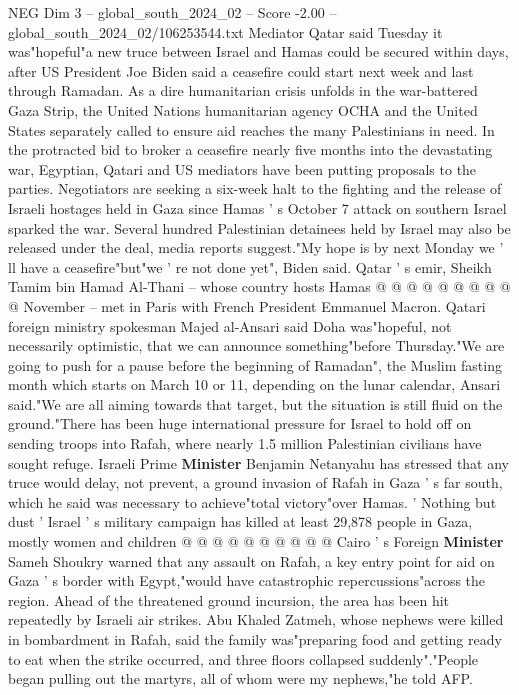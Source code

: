 \begin{textsample}{NEG Dim 3 – global\_south\_2024\_02 – Score -2.00 – global\_south\_2024\_02/106253544.txt}  \label{ex:f3_neg_082}
Mediator Qatar said Tuesday it was"hopeful"a new truce between Israel and Hamas could be secured within days, after US President Joe Biden said a ceasefire could start next week and last through Ramadan.
As a dire humanitarian crisis unfolds in the war-battered Gaza Strip, the United Nations humanitarian agency OCHA and the United States separately called to ensure aid reaches the many Palestinians in need.
In the protracted bid to broker a ceasefire nearly five months into the devastating war, Egyptian, Qatari and US mediators have been putting proposals to the parties.
Negotiators are seeking a six-week halt to the fighting and the release of Israeli hostages held in Gaza since Hamas ' s October 7 attack on southern Israel sparked the war.
Several hundred Palestinian detainees held by Israel may also be released under the deal, media reports suggest."My hope is by next Monday we ' ll have a ceasefire"but"we ' re not done yet", Biden said.
Qatar ' s emir, Sheikh Tamim bin Hamad Al-Thani -- whose country hosts Hamas @ @ @ @ @ @ @ @ @ @ November -- met in Paris with French President Emmanuel Macron.
Qatari foreign ministry spokesman Majed al-Ansari said Doha was"hopeful, not necessarily optimistic, that we can announce something"before Thursday."We are going to push for a pause before the beginning of Ramadan", the Muslim fasting month which starts on March 10 or 11, depending on the lunar calendar, Ansari said."We are all aiming towards that target, but the situation is still fluid on the ground."There has been huge international pressure for Israel to hold off on sending troops into Rafah, where nearly 1.5 million Palestinian civilians have sought refuge.
Israeli Prime \textbf{Minister} Benjamin Netanyahu has stressed that any truce would delay, not prevent, a ground invasion of Rafah in Gaza ' s far south, which he said was necessary to achieve"total victory"over Hamas. ' Nothing but dust ' Israel ' s military campaign has killed at least 29,878 people in Gaza, mostly women and children @ @ @ @ @ @ @ @ @ @ Cairo ' s Foreign \textbf{Minister} Sameh Shoukry warned that any assault on Rafah, a key entry point for aid on Gaza ' s border with Egypt,"would have catastrophic repercussions"across the region.
Ahead of the threatened ground incursion, the area has been hit repeatedly by Israeli air strikes.
Abu Khaled Zatmeh, whose nephews were killed in bombardment in Rafah, said the family was"preparing food and getting ready to eat when the strike occurred, and three floors collapsed suddenly"."People began pulling out the martyrs, all of whom were my nephews,"he told AFP.

\end{textsample}
